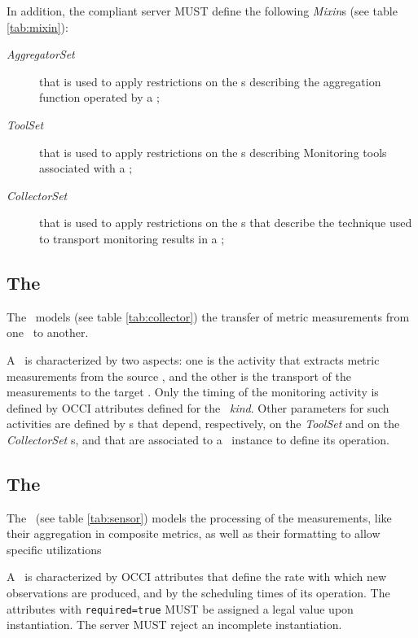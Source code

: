 \documentclass[12pt]{article}  %
\begin{document}
In addition, the compliant server MUST define the following {\em Mixin}s (see table \ref{tab:mixin}): 

\begin{description}

\item [{\em AggregatorSet}] that is used to apply restrictions on the \mi s describing the aggregation function operated by a \sens;

\item [{\em ToolSet}] that is used to apply restrictions on the \mi s describing Monitoring tools associated with a \coll;

\item [{\em CollectorSet}] that is used to apply restrictions on the \mi s that describe the technique used to transport monitoring results in a \coll;

\end{description}



\subsection{The \coll}



The \coll\ models  (see table \ref{tab:collector}) the transfer of metric measurements from one \rs\ to another.

A \coll\ is characterized by two aspects: one is the activity that extracts metric measurements from the source \rs, and the other is the transport of the measurements to the target \rs. Only the timing of the monitoring activity is defined by OCCI attributes defined for the \coll\ {\em kind}. Other parameters for such activities are defined by \mi s that depend, respectively, on the {\em ToolSet} and on the {\em CollectorSet} \mi s, and that are associated to a \coll\ instance to define its operation. 

\subsection{The \sens \label{sec:sensor}}



The \sens\ (see table \ref{tab:sensor}) models the processing of the measurements, like their aggregation in composite metrics, as well as their formatting to allow specific utilizations

A \sens\ is characterized by OCCI attributes that define the rate with which new observations are produced, and by the scheduling times of its operation. The attributes with \verb|required=true| MUST be assigned a legal value upon instantiation. The server MUST reject an incomplete instantiation.
\end{document}
